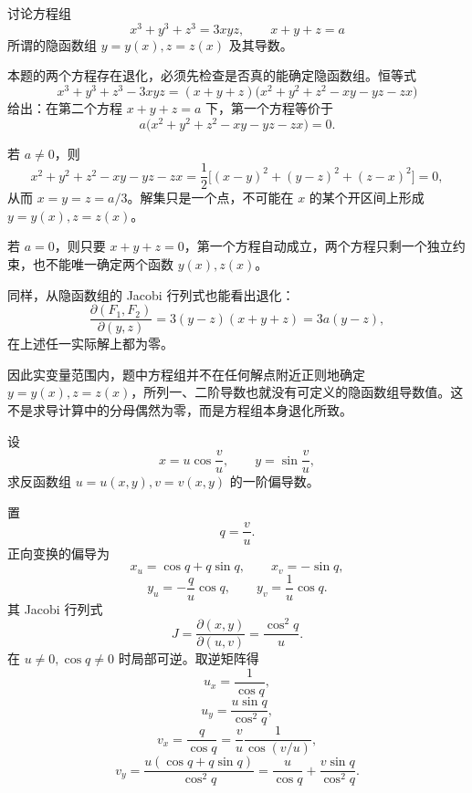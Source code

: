 \begin{xexercise}[20.2.5 练习题 3]
讨论方程组
\[
  x^3+y^3+z^3=3xyz,
  \qquad x+y+z=a
\]
所谓的隐函数组 $y=y(x),z=z(x)$ 及其导数。
\end{xexercise}
\begin{xsolution}
本题的两个方程存在退化，必须先检查是否真的能确定隐函数组。恒等式
\[
  x^3+y^3+z^3-3xyz
  =(x+y+z)
  \bigl(x^2+y^2+z^2-xy-yz-zx\bigr)
\]
给出：在第二个方程 $x+y+z=a$ 下，第一个方程等价于
\[
  a\bigl(x^2+y^2+z^2-xy-yz-zx\bigr)=0.
\]

若 $a\ne0$，则
\[
  x^2+y^2+z^2-xy-yz-zx
  =\frac12\bigl[(x-y)^2+(y-z)^2+(z-x)^2\bigr]=0,
\]
从而 $x=y=z=a/3$。解集只是一个点，不可能在 $x$ 的某个开区间上形成 $y=y(x),z=z(x)$。

若 $a=0$，则只要 $x+y+z=0$，第一个方程自动成立，两个方程只剩一个独立约束，也不能唯一确定两个函数 $y(x),z(x)$。

同样，从隐函数组的 Jacobi 行列式也能看出退化：
\[
  \frac{\partial(F_1,F_2)}{\partial(y,z)}
  =3(y-z)(x+y+z)=3a(y-z),
\]
在上述任一实际解上都为零。

因此实变量范围内，题中方程组并不在任何解点附近正则地确定 $y=y(x),z=z(x)$，所列一、二阶导数也就没有可定义的隐函数组导数值。这不是求导计算中的分母偶然为零，而是方程组本身退化所致。
\end{xsolution}

\begin{xexercise}[20.2.5 练习题 4]
设
\[
  x=u\cos\frac vu,\qquad y=\sin\frac vu,
\]
求反函数组 $u=u(x,y),v=v(x,y)$ 的一阶偏导数。
\end{xexercise}
\begin{xsolution}
置
\[
  q=\frac vu.
\]
正向变换的偏导为
\[
  x_u=\cos q+q\sin q,
  \qquad x_v=-\sin q,
\]
\[
  y_u=-\frac q u\cos q,
  \qquad y_v=\frac1u\cos q.
\]
其 Jacobi 行列式
\[
  J=\frac{\partial(x,y)}{\partial(u,v)}
  =\frac{\cos^2q}{u}.
\]
在 $u\ne0,\cos q\ne0$ 时局部可逆。取逆矩阵得
\[
  \boxed{\displaystyle u_x=\frac1{\cos q}},
\]
\[
  \boxed{\displaystyle
    u_y=\frac{u\sin q}{\cos^2q}},
\]
\[
  \boxed{\displaystyle
    v_x=\frac q{\cos q}=\frac vu\frac1{\cos(v/u)}},
\]
\[
  \boxed{\displaystyle
    v_y=\frac{u(\cos q+q\sin q)}{\cos^2q}
       =\frac{u}{\cos q}+\frac{v\sin q}{\cos^2q}}.
\]
\end{xsolution}

